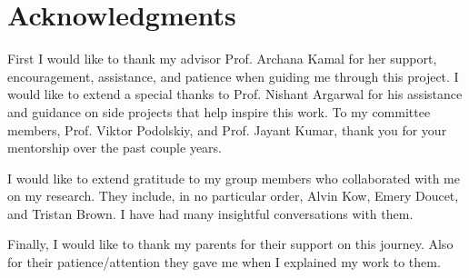 \documentclass[12pt,letterpaper]{report}
\numberwithin{equation}{section}
\begin{document}
\chapter*{\label{sec:abstract}Acknowledgments}

%
First I would like to thank my advisor Prof. Archana Kamal for her support, encouragement, assistance, and patience when guiding me through this project. I would like to extend a special thanks to Prof. Nishant Argarwal for his assistance and guidance on side projects that help inspire this work. To my committee members, Prof. Viktor Podolskiy, and Prof. Jayant Kumar, thank you for your mentorship over the past couple years. 

I would like to extend gratitude to my group members who collaborated with me on my research. They include, in no particular order, Alvin Kow, Emery Doucet, and Tristan Brown. I have had many insightful conversations with them.

Finally, I would like to thank my parents for their support on this journey. Also for their patience/attention they gave me when I explained my work to them.


\clearpage

\tableofcontents
\listoftables
\listoffigures
\clearpage
{}












\appendix

\end{document}
